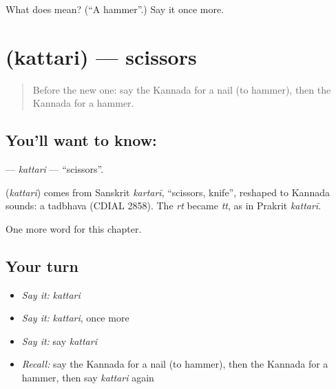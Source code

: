 \begin{tcolorbox}[breakable,colback=teal!4,colframe=teal!35!black,title={Before you move on}]
What does  mean? (\textquotedblleft{}A hammer\textquotedblright{}.) Say it once more.
\end{tcolorbox}
\section[\texorpdfstring{\kn{ಕತ್ತರಿ} (kattari)}{ಕತ್ತರಿ (kattari)}]{ (kattari) — scissors}

\label{lesson:KA-C117-kattari}



\begin{quote}
Before the new one: say the Kannada for a nail (to hammer), then the Kannada for a hammer.
\end{quote}

\subsection*{You'll want to know: }
\textbf{} — \emph{kattari} — \textquotedblleft{}scissors\textquotedblright{}.

\begin{cousinweb}
\textbf{} (\emph{kattari}) comes from Sanskrit \emph{kartarī}, \textquotedblleft{}scissors, knife\textquotedblright{}, reshaped to Kannada sounds: a tadbhava (CDIAL 2858). The \emph{rt} became \emph{tt}, as in Prakrit \emph{kattarī}.
\end{cousinweb}

\begin{grammarlens}[title={What you've built}]
One more word for this chapter.
\end{grammarlens}

\subsection*{Your turn}
\begin{itemize}
\raggedright
  \item \emph{Say it:} \emph{kattari}
  \item \emph{Say it:} \emph{kattari}, once more
  \item \emph{Say it:} say \emph{kattari}
  \item \emph{Recall:} say the Kannada for a nail (to hammer), then the Kannada for a hammer, then say \emph{kattari} again
\end{itemize}

